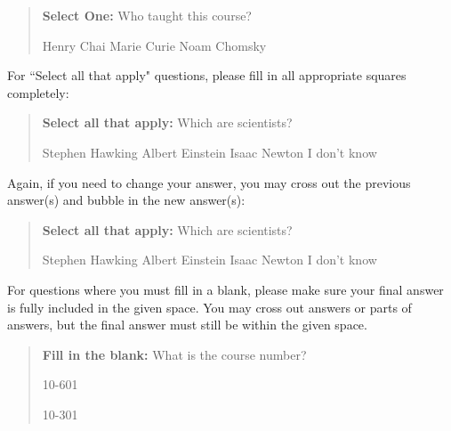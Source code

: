 \documentclass[11pt,addpoints,answers]{exam}
\newcommand{\blackcircle}{\tikz\draw[black,fill=black] (0,0) circle (1ex);}
\begin{document}
\begin{quote}
\textbf{Select One:} Who taught this course?
    {
    \begin{checkboxes}
     \CorrectChoice Henry Chai
     \choice Marie Curie \checkboxchar{\xcancel{\blackcircle}{}}
     \choice Noam Chomsky
    \end{checkboxes}
    }
\end{quote}

For ``Select all that apply" questions, please fill in all appropriate squares completely:

\begin{quote}
\textbf{Select all that apply:} Which are scientists?
    {%
    \checkboxchar{$\Box$} \checkedchar{$\blacksquare$} %
    \begin{checkboxes}
    \CorrectChoice Stephen Hawking 
    \CorrectChoice Albert Einstein
    \CorrectChoice Isaac Newton
    \choice I don't know
    \end{checkboxes}
    }
\end{quote}

Again, if you need to change your answer, you may cross out the previous answer(s) and bubble in the new answer(s):

\begin{quote}
\textbf{Select all that apply:} Which are scientists?
    {%
    \checkboxchar{\xcancel{$\blacksquare$}} \checkedchar{$\blacksquare$} %
    \begin{checkboxes}
    \CorrectChoice Stephen Hawking 
    \CorrectChoice Albert Einstein
    \CorrectChoice Isaac Newton
    \choice I don't know
    \end{checkboxes}
    }
\end{quote}

For questions where you must fill in a blank, please make sure your final answer is fully included in the given space. You may cross out answers or parts of answers, but the final answer must still be within the given space.

\begin{quote}
\textbf{Fill in the blank:} What is the course number?

\begin{tcolorbox}[fit,height=1cm, width=4cm, blank, borderline={1pt}{-2pt},nobeforeafter]
    \begin{center}\huge10-601\end{center}
    \end{tcolorbox}\hspace{2cm}
    \begin{tcolorbox}[fit,height=1cm, width=4cm, blank, borderline={1pt}{-2pt},nobeforeafter]
    \begin{center}\huge10-301\end{center}
    \end{tcolorbox}
\end{quote}
\clearpage
\end{document}
